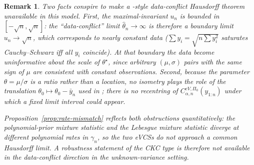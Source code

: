 \documentclass{article}%
\newtheorem{assumption}[theorem]{Assumption}
\newtheorem{remark}[theorem]{Remark}
\newcommand{\R}{\mathbb{R}}
\begin{document}
\begin{remark}\label{rem:why-no-data-conflict}
Two facts conspire to make a \cite{Cortinovis2025}-style data-conflict Hausdorff theorem unavailable in this model. First, the maximal-invariant
\(u_n\) is bounded in \([-\sqrt n,\sqrt n]\): the
``data-conflict'' limit \(\widehat\theta_n\to\infty\) is therefore a
boundary limit \(u_n\to\sqrt n\), which corresponds to nearly
constant data (\(\sum y_i=\sqrt{n\sum y_i^2}\) saturates
Cauchy--Schwarz iff all \(y_i\) coincide). At that boundary the data
become uninformative about the scale of \(\theta^\star\), since
arbitrary \((\mu,\sigma)\) pairs with the same sign of \(\mu\) are
consistent with constant observations. Second, because the
parameter \(\theta=\mu/\sigma\) is a ratio rather than a location, no
isometry plays the role of the translation
\(\theta_0\mapsto\theta_0-\bar y_n\) used in
\cite[Theorem~4.4]{Cortinovis2025}; there is no recentring of
\(C^{eV,\Pi_0}_{\alpha,n}(y_{1:n})\) under which a fixed limit
interval could appear.

Proposition~\ref{prop:rate-mismatch} reflects both obstructions
quantitatively: the polynomial-prior mixture statistic and the
Lebesgue mixture statistic diverge at \emph{different} polynomial
rates in \(\gamma_n\), so the two eVCSs do not approach a common
Hausdorff limit. A robustness statement of the CKC type is therefore
not available in the data-conflict direction in the unknown-variance
setting.
\end{remark}





\end{document}
